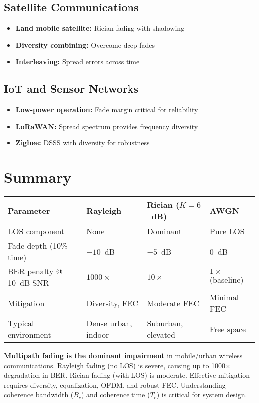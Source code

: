 \subsection{Satellite Communications}
\begin{itemize}
\item \textbf{Land mobile satellite:} Rician fading with shadowing
\item \textbf{Diversity combining:} Overcome deep fades
\item \textbf{Interleaving:} Spread errors across time
\end{itemize}

\subsection{IoT and Sensor Networks}
\begin{itemize}
\item \textbf{Low-power operation:} Fade margin critical for reliability
\item \textbf{LoRaWAN:} Spread spectrum provides frequency diversity
\item \textbf{Zigbee:} DSSS with diversity for robustness
\end{itemize}

\section{Summary}

\begin{center}
\begin{tabular}{@{}llll@{}}
\toprule
\textbf{Parameter} & \textbf{Rayleigh} & \textbf{Rician ($K=6$~dB)} & \textbf{AWGN} \\
\midrule
LOS component & None & Dominant & Pure LOS \\
Fade depth (10\% time) & $-10$~dB & $-5$~dB & 0~dB \\
BER penalty @ 10~dB SNR & $1000\times$ & $10\times$ & $1\times$ (baseline) \\
Mitigation & Diversity, FEC & Moderate FEC & Minimal FEC \\
Typical environment & Dense urban, indoor & Suburban, elevated & Free space \\
\bottomrule
\end{tabular}
\end{center}

\begin{keyconcept}
\textbf{Multipath fading is the dominant impairment} in mobile/urban wireless communications. Rayleigh fading (no LOS) is severe, causing up to 1000$\times$ degradation in BER. Rician fading (with LOS) is moderate. Effective mitigation requires diversity, equalization, OFDM, and robust FEC. Understanding coherence bandwidth ($B_c$) and coherence time ($T_c$) is critical for system design.
\end{keyconcept}

